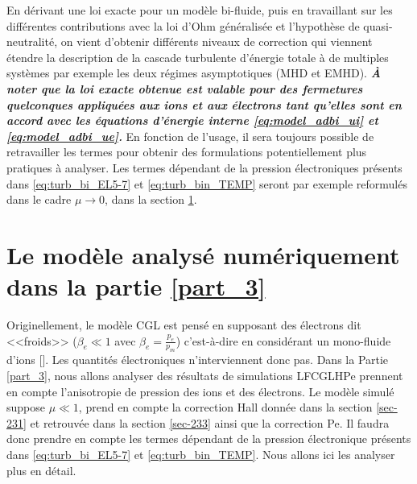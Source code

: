 En dérivant une loi exacte pour un modèle bi-fluide, puis en travaillant sur les différentes contributions avec la loi d'Ohm généralisée et l'hypothèse de quasi-neutralité, on vient d'obtenir différents niveaux de correction qui viennent étendre la description de la cascade turbulente d'énergie totale à de multiples systèmes par exemple les deux régimes asymptotiques (\ac{MHD} et \acs{EMHD}). \emph{\bf À noter que la loi exacte obtenue est valable pour des fermetures quelconques appliquées aux ions et aux électrons tant qu'elles sont en accord avec les équations d'énergie interne \eqref{eq:model_adbi_ui} et \eqref{eq:model_adbi_ue}.} En fonction de l'usage, il sera toujours possible de retravailler les termes pour obtenir des formulations potentiellement plus pratiques à analyser. Les termes dépendant de la pression électroniques présents dans \eqref{eq:turb_bi_EL5-7} et \eqref{eq:turb_bin_TEMP} seront par exemple reformulés dans le cadre $\mu \rightarrow 0$, dans la section \ref{sec-232}. 




\section{Le modèle analysé numériquement dans la partie \ref{part_3}}
\label{sec-232}

Originellement, le modèle \acs{CGL} est pensé en supposant des électrons dit <<froids>> ($\beta_e \ll 1$ avec $\beta_e = \frac{p_e}{p_m}$) c'est-à-dire en considérant un mono-fluide d'ions [\cite{hunana_introductory_2019}]. Les quantités électroniques n'interviennent donc pas. Dans la Partie \ref{part_3}, nous allons analyser des résultats de simulations \acs{LFCGLHPe} prennent en compte l'anisotropie de pression des ions et des électrons. Le modèle simulé suppose $\mu \ll 1$, prend en compte la correction \acs{Hall} donnée dans la section \ref{sec-231} et retrouvée dans la section \ref{sec-233} ainsi que la correction \acs{Pe}. Il faudra donc prendre en compte les termes dépendant de la pression électronique présents dans \eqref{eq:turb_bi_EL5-7} et \eqref{eq:turb_bin_TEMP}. Nous allons ici les analyser plus en détail. 


